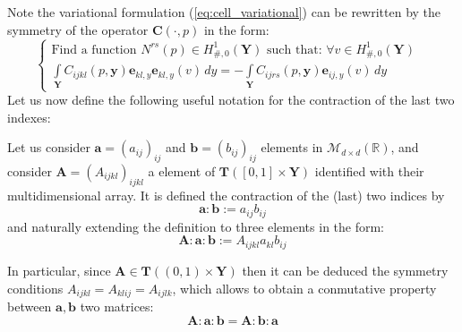 Note the variational formulation (\ref{eq:cell_variational}) can be rewritten by the symmetry of the operator $\mathbf{C}(\cdot,p)$ in the form:
\begin{equation}
    \label{eq:cell_symmetric}
    \left \{
    \begin{array}{cc}
        \text{Find a function } N^{rs}(p) \in H^1_{\#,0}(\mathbf{Y}) \text{ such that: } \forall v \in H^1_{\#, 0}(\mathbf{Y})&\\
        \int\limits_{\mathbf{Y}} C_{ijkl}(p,\mathbf{y})\mathbf{e}_{kl,y} \mathbf{e}_{kl,y}(v)\,dy = -\int\limits_{\mathbf{Y}} C_{ijrs}(p,\mathbf{y}) \mathbf{e}_{ij,y}(v)\,dy & 
    \end{array}
    \right.
\end{equation}
Let us now define the following useful notation for the contraction of the last two indexes:
\begin{defn}
Let us consider $\mathbf{a} = (a_{ij})_{ij}$ and $\mathbf{b} = (b_{ij})_{ij}$ elements in $\mathcal{M}_{d\times d}(\mathbb{R})$, and consider $\mathbf{A}=(A_{ijkl})_{ijkl}$ a element of $\mathbf{T}([0,1]\times \mathbf{Y})$ identified with their multidimensional array. It is defined the contraction of the (last) two indices by
\begin{equation*}
    \mathbf{a}:\mathbf{b} := a_{ij}b_{ij}
\end{equation*}
and naturally extending the definition to three elements in the form:
\begin{equation*}
    \mathbf{A}:\mathbf{a}:\mathbf{b} := A_{ijkl}a_{kl}b_{ij}
\end{equation*}
\end{defn}
\begin{rem}
In particular, since $\mathbf{A} \in \mathbf{T}((0,1)\times \mathbf{Y})$ then it can be deduced the symmetry conditions $A_{ijkl}=A_{klij}=A_{ijlk}$, which allows to obtain a conmutative property between $\mathbf{a},\mathbf{b}$ two matrices:
\begin{equation}
    \mathbf{A}: \mathbf{a}:\mathbf{b}= \mathbf{A}:\mathbf{b}:\mathbf{a}
\end{equation}
\end{rem}


